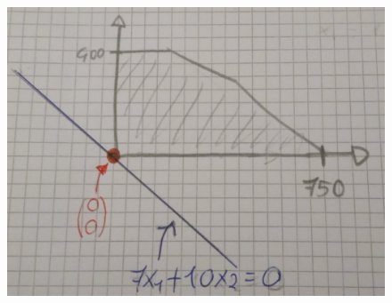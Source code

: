 \documentclass{article}
\begin{document}
\begin{figure}[h!]
    \centering
    \includegraphics[scale=0.3]{rettaricavotot.jpeg}
\end{figure}
\end{document}

